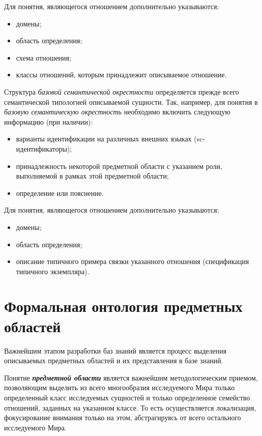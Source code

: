 Для понятия, являющегося отношением дополнительно указываются:
\begin{itemize}
	\item {домены};
	\item{область определения};
	\item{схема отношения};
	\item{классы отношений, которым принадлежит описываемое отношение}.
\end{itemize}

\begin{SCn}
\end{SCn}

Структура \textit{базовой семантической окрестности} определяется прежде всего семантической типологией описываемой сущности. Так, например, для понятия в \textit{базовую семантическую окрестность} необходимо включить следующую  информацию (при наличии):
\begin{itemize}
	\item {варианты идентификации на различных внешних языках (sc-идентификаторы)};
	\item {принадлежность некоторой предметной области с указанием роли, выполняемой в рамках этой предметной области};
	\item{определение или пояснение}.
\end{itemize}

Для понятия, являющегося отношением дополнительно указываются:
\begin{itemize}
	\item {домены};
	\item {область определения};
	\item {описание типичного примера связки указанного отношения (спецификация типичного экземпляра)}.
\end{itemize}

\section{Формальная онтология предметных областей}

Важнейшим этапом разработки баз знаний является процесс выделения описываемых предметных областей и их представления в базе знаний.

Понятие \textit{\textbf{предметной области}} является важнейшим методологическим приемом, позволяющим выделить из всего многообразия исследуемого Мира только определенный класс исследуемых сущностей и только определенное семейство отношений, заданных на указанном классе. То есть осуществляется локализация,
фокусирование внимания только на этом, абстрагируясь от всего остального исследуемого Мира.

